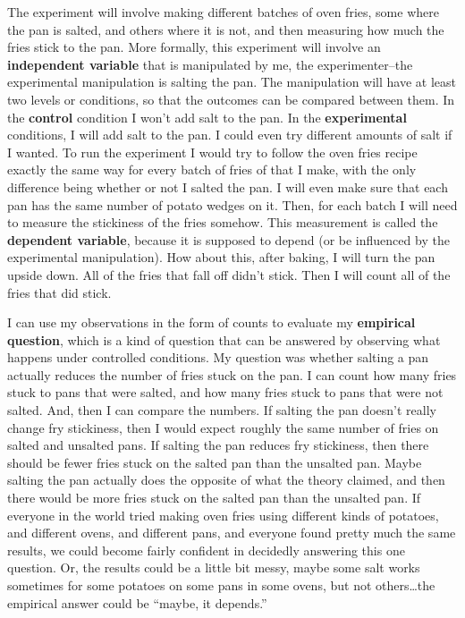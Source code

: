 \documentclass[
  oneside,
  12pt]{crumpbook}
\begin{document}
The experiment will involve making different batches of oven fries, some where the pan is salted, and others where it is not, and then measuring how much the fries stick to the pan. More formally, this experiment will involve an \textbf{independent variable} that is manipulated by me, the experimenter--the experimental manipulation is salting the pan. The manipulation will have at least two levels or conditions, so that the outcomes can be compared between them. In the \textbf{control} condition I won't add salt to the pan. In the \textbf{experimental} conditions, I will add salt to the pan. I could even try different amounts of salt if I wanted. To run the experiment I would try to follow the oven fries recipe exactly the same way for every batch of fries of that I make, with the only difference being whether or not I salted the pan. I will even make sure that each pan has the same number of potato wedges on it. Then, for each batch I will need to measure the stickiness of the fries somehow. This measurement is called the \textbf{dependent variable}, because it is supposed to depend (or be influenced by the experimental manipulation). How about this, after baking, I will turn the pan upside down. All of the fries that fall off didn't stick. Then I will count all of the fries that did stick.

I can use my observations in the form of counts to evaluate my \textbf{empirical question}, which is a kind of question that can be answered by observing what happens under controlled conditions. My question was whether salting a pan actually reduces the number of fries stuck on the pan. I can count how many fries stuck to pans that were salted, and how many fries stuck to pans that were not salted. And, then I can compare the numbers. If salting the pan doesn't really change fry stickiness, then I would expect roughly the same number of fries on salted and unsalted pans. If salting the pan reduces fry stickiness, then there should be fewer fries stuck on the salted pan than the unsalted pan. Maybe salting the pan actually does the opposite of what the theory claimed, and then there would be more fries stuck on the salted pan than the unsalted pan. If everyone in the world tried making oven fries using different kinds of potatoes, and different ovens, and different pans, and everyone found pretty much the same results, we could become fairly confident in decidedly answering this one question. Or, the results could be a little bit messy, maybe some salt works sometimes for some potatoes on some pans in some ovens, but not others\ldots the empirical answer could be ``maybe, it depends.''
\end{document}
